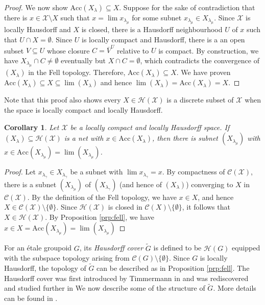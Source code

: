 \documentclass[a4paper, 12pt]{amsart}
\newtheorem{cor}[thm]{Corollary}
\theoremstyle{definition}
\theoremstyle{remark}
\numberwithin{equation}{section}
\begin{document}
\begin{proof}
    We now show $\text{Acc}(X_{\lambda})\subseteq X$. Suppose for the sake of contradiction that there is $x\in \mathcal{X}\setminus X$ such that $x = \lim x_{\lambda_{\mu}}$ for some subnet $x_{\lambda_{\mu}}\in X_{\lambda_{\mu}}$. Since $\mathcal{X}$ is locally Hausdorff and $X$ is closed, there is a Hausdorff neighbourhood $U$ of $x$ such that $U\cap X = \emptyset$. Since $U$ is locally compact and Hausdorff, there is a an open subset $V\subseteq U$ whose closure $C = \overline{V}^{U}$ relative to $U$ is compact. By construction, we have $X_{\lambda_{\mu}}\cap C\neq\emptyset$ eventually but $X\cap C = \emptyset$, which contradicts the convergence of $(X_{\lambda})$ in the Fell topology. Therefore, $\text{Acc}(X_{\lambda})\subseteq X$. We have proven $\text{Acc}(X_{\lambda})\subseteq X\subseteq \lim(X_{\lambda})$ and hence $\lim(X_{\lambda}) = \text{Acc}(X_{\lambda}) = X$.
\end{proof}
Note that this proof also shows every $X\in\mathcal{H}(\mathcal{X})$ is a discrete subset of $\mathcal{X}$ when the space is locally compact and locally Hausdorff.

\begin{cor}
\label{cor:compactness}
    Let $\mathcal{X}$ be a locally compact and locally Hausdorff space. If $(X_{\lambda})\subseteq \mathcal{H}(\mathcal{X})$ is a net with $x\in \text{Acc}(X_{\lambda})$, then there is subnet $(X_{\lambda_{\mu}})$ with $x\in  \text{Acc}(X_{\lambda_{\mu}}) = \lim(X_{\lambda_{\mu}})$.
\end{cor}

\begin{proof}
    Let $x_{\lambda_{\gamma}}\in X_{\lambda_{\gamma}}$ be a subnet with $\lim x_{\lambda_{\gamma}} = x$. By compactness of $\mathcal{C}(\mathcal{X})$, there is a subnet $(X_{\lambda_{\mu}})$ of $(X_{\lambda_{\gamma}})$ (and hence of $(X_{\lambda})$) converging to $X$ in $\mathcal{C}(\mathcal{X})$. By the definition of the Fell topology, we have $x\in X$, and hence $X\in\mathcal{C}(\mathcal{X})\setminus\{\emptyset\}$. Since $\mathcal{H}(\mathcal{X})$ is closed in $\mathcal{C}(X)\setminus\{\emptyset\}$, it follows that $X\in\mathcal{H}(\mathcal{X})$. By Proposition \ref{prp:fell}, we have $x\in X = \text{Acc}(X_{\lambda_{\mu}}) = \lim(X_{\lambda_{\mu}})$
\end{proof}

For an \'etale groupoid $G$, its \emph{Hausdorff cover} $\tilde{G}$ is defined to be $\mathcal{H}(G)$ equipped with the subspace topology arising from $\mathcal{C}(G)\setminus \{\emptyset\}$. Since $G$ is locally Hausdorff, the topology of $\tilde{G}$ can be described as in Proposition \ref{prp:fell}. The Hausdorff cover was first introduced by Timmermann in \cite{T11} and was rediscovered and studied further in \cite{BGHL25} We now describe some of the structure of $\tilde{G}$. More details can be found in \cite{BGHL25}. 
\end{document}
